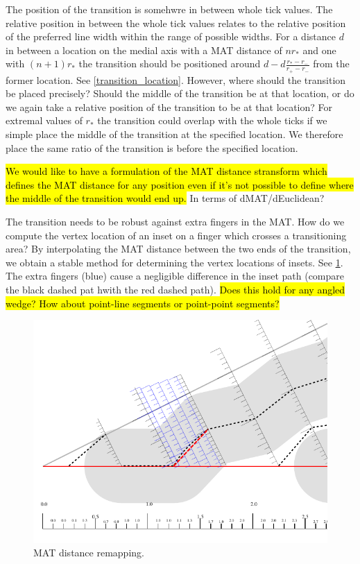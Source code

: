 The position of the transition is somehwre in between whole tick values.
The relative position in between the whole tick values relates to the relative position of the preferred line width within the range of possible widths.
For a distance $d$ in between a location on the medial axis with a MAT distance of $nr_*$ and one with $(n+1)r_*$ the transition should be positioned around $d - d\frac{r_* - r_-}{r_+ - r_-}$ from the former location.
See \cref{transition_location}.
However, where should the transition be placed precisely? Should the middle of the transition be at that location, or do we again take a relative position of the transition to be at that location?
For extremal values of $r_*$ the transition could overlap with the whole ticks if we simple place the middle of the transition at the specified location.
We therefore place the same ratio of the transition is before the specified location.


\hl{We would like to have a formulation of the MAT distance stransform which defines the MAT distance for any position even if it's not possible to define where the middle of the transition would end up.}
In terms of dMAT/dEuclidean?

The transition needs to be robust against extra fingers in the MAT.
How do we compute the vertex location of an inset on a finger which crosses a transitioning area?
By interpolating the MAT distance between the two ends of the transition, we obtain a stable method for determining the vertex locations of insets.
See \cref{distance_rounding_transition}.
The extra fingers (blue) cause a negligible difference in the inset path (compare the black dashed pat hwith the red dashed path).
\hl{Does this hold for any angled wedge? How about point-line segments or point-point segments?}

\begin{figure}[H]
\centering
\includegraphics[width=.9\columnwidth]{sources/method/distance_rounding_transition.pdf}
\caption{MAT distance remapping.}
\label{distance_rounding_transition}
\end{figure}


